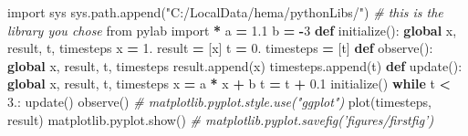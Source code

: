 \documentclass[]{article}
\newenvironment{Shaded}{\begin{snugshade}}{\end{snugshade}}
\newcommand{\KeywordTok}[1]{\textcolor[rgb]{0.13,0.29,0.53}{\textbf{#1}}}
\newcommand{\DecValTok}[1]{\textcolor[rgb]{0.00,0.00,0.81}{#1}}
\newcommand{\FloatTok}[1]{\textcolor[rgb]{0.00,0.00,0.81}{#1}}
\newcommand{\StringTok}[1]{\textcolor[rgb]{0.31,0.60,0.02}{#1}}
\newcommand{\ImportTok}[1]{#1}
\newcommand{\CommentTok}[1]{\textcolor[rgb]{0.56,0.35,0.01}{\textit{#1}}}
\newcommand{\ControlFlowTok}[1]{\textcolor[rgb]{0.13,0.29,0.53}{\textbf{#1}}}
\newcommand{\OperatorTok}[1]{\textcolor[rgb]{0.81,0.36,0.00}{\textbf{#1}}}
\newcommand{\NormalTok}[1]{#1}
\begin{document}
\begin{Shaded}
\begin{Highlighting}[]
\ImportTok{import}\NormalTok{ sys}
\NormalTok{sys.path.append(}\StringTok{"C:/LocalData/hema/pythonLibs/"}\NormalTok{) }\CommentTok{# this is the library you chose}
\ImportTok{from}\NormalTok{ pylab }\ImportTok{import} \OperatorTok{*}
\NormalTok{a }\OperatorTok{=} \FloatTok{1.1}
\NormalTok{b }\OperatorTok{=} \OperatorTok{-}\DecValTok{3}
\KeywordTok{def}\NormalTok{ initialize():}
    \KeywordTok{global}\NormalTok{ x, result, t, timesteps}
\NormalTok{    x }\OperatorTok{=} \DecValTok{1}\NormalTok{.}
\NormalTok{    result }\OperatorTok{=}\NormalTok{ [x]}
\NormalTok{    t }\OperatorTok{=} \DecValTok{0}\NormalTok{.}
\NormalTok{    timesteps }\OperatorTok{=}\NormalTok{ [t]}
\KeywordTok{def}\NormalTok{ observe():}
    \KeywordTok{global}\NormalTok{ x, result, t, timesteps}
\NormalTok{    result.append(x)}
\NormalTok{    timesteps.append(t)}
\KeywordTok{def}\NormalTok{ update():}
    \KeywordTok{global}\NormalTok{ x, result, t, timesteps}
\NormalTok{    x }\OperatorTok{=}\NormalTok{ a }\OperatorTok{*}\NormalTok{ x }\OperatorTok{+}\NormalTok{ b}
\NormalTok{    t }\OperatorTok{=}\NormalTok{ t }\OperatorTok{+} \FloatTok{0.1}
\NormalTok{initialize()}
\ControlFlowTok{while}\NormalTok{ t }\OperatorTok{<} \DecValTok{3}\NormalTok{.:}
\NormalTok{    update()}
\NormalTok{    observe()}
\CommentTok{# matplotlib.pyplot.style.use("ggplot")}
\NormalTok{plot(timesteps, result)}
\NormalTok{matplotlib.pyplot.show()}
\CommentTok{# matplotlib.pyplot.savefig('figures/firstfig')}
\end{Highlighting}
\end{Shaded}
\end{document}

